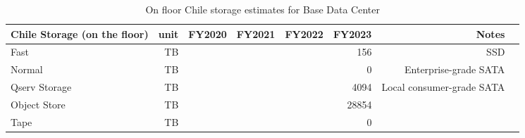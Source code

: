 \tiny \begin{longtable} { |p{}  |r  |r  |r  |r  |r  |r  |r |} 
\caption{On floor Chile storage estimates for Base Data Center \label{tab:chileStorage}}\\ 
\hline 
\textbf{Chile Storage (on the floor)}&\textbf{unit}&\textbf{FY2020}&\textbf{FY2021}&\textbf{FY2022}&\textbf{FY2023}&\textbf{Notes} \\ \hline
{Fast}&{TB}&{}&{}&{}&{156}&{SSD} \\ \hline
{Normal}&{TB}&{}&{}&{}&{0}&{Enterprise-grade SATA} \\ \hline
{Qserv Storage}&{TB}&{}&{}&{}&{4094}&{Local consumer-grade SATA} \\ \hline
{Object Store}&{TB}&{}&{}&{}&{28854}& \\ \hline
{Tape}&{TB}&{}&{}&{}&{0}& \\ \hline
\end{longtable} \normalsize
